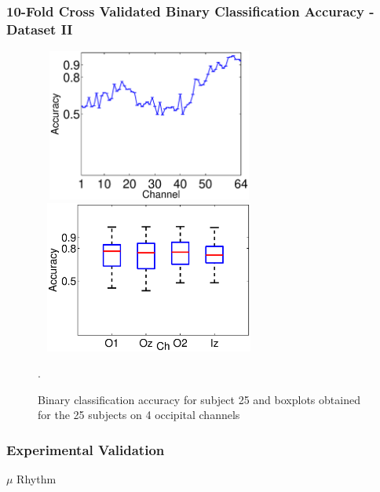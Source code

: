 \documentclass[aspectratio=169]{beamer}
\begin{document}
\begin{frame}
\frametitle{10-Fold Cross Validated Binary Classification Accuracy - Dataset II}
\begin{figure}[h!]
\centering
\includegraphics[width=7.5cm, height=5cm]{images/DatasetPhysionetAccuracyPerChannel}
\includegraphics[width=7.5cm, height=5cm]{images/DatasetPhysionetBoxPlots}
\caption{Binary classification accuracy for subject 25 and boxplots obtained for the 25 subjects on 4 occipital channels}.
\label{fig:alpharesultsdatasetii}
\end{figure}
\end{frame}

\begin{frame}
\frametitle{Experimental Validation}
\begin{center}
\LARGE $\mu$ Rhythm
\end{center}
\end{frame}
\end{document}
